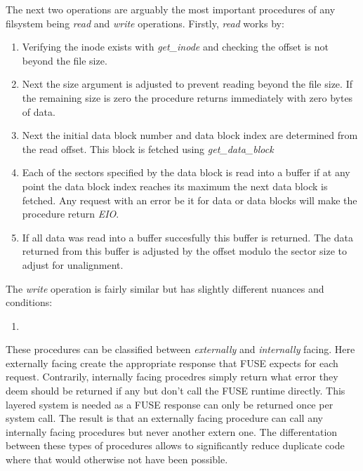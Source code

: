 The next two operations are arguably the most important procedures of any
filsystem being \textit{read} and \textit{write} operations. Firstly,
\textit{read} works by:

\begin{enumerate}
    \item Verifying the inode exists with \textit{get\_inode} and checking the
    offset is not beyond the file size.
    \item Next the size argument is adjusted to prevent reading beyond the file
    size. If the remaining size is zero the procedure returns immediately with
    zero bytes of data.
    \item Next the initial data block number and data block index are determined
    from the read offset. This block is fetched using \textit{get\_data\_block}
    \item Each of the sectors specified by the data block is read into a buffer
    if at any point the data block index reaches its maximum the next data
    block is fetched. Any request with an error be it for data or data
    blocks will make the procedure return \textit{EIO}.
    \item If all data was read into a buffer succesfully this buffer is
    returned. The data returned from this buffer is adjusted by the offset
    modulo the sector size to adjust for unalignment.
\end{enumerate}

The \textit{write} operation is fairly similar but has slightly different
nuances and conditions:

\begin{enumerate}
    \item
\end{enumerate}

These procedures can be classified between \textit{externally} and
\textit{internally} facing. Here externally facing create the appropriate
response that FUSE expects for each request. Contrarily, internally facing
procedres simply return what error they deem should be returned if any but don't
call the FUSE runtime directly. This layered system is needed as a FUSE response
can only be returned once per system call. The result is that an externally
facing procedure can call any internally facing procedures but never another
extern one. The differentation between these types of procedures allows to
significantly reduce duplicate code where that would otherwise not have been
possible.



